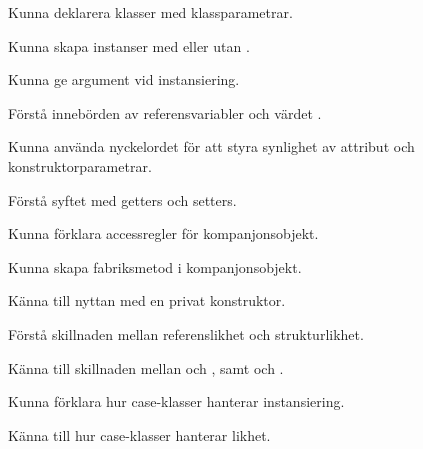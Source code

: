 

\item Kunna deklarera klasser med klassparametrar.
\item Kunna skapa instanser med eller utan .
\item Kunna ge argument vid instansiering.
\item Förstå innebörden av referensvariabler och värdet .

\item Kunna använda nyckelordet  för att styra synlighet av attribut och konstruktorparametrar.

\item Förstå syftet med getters och setters.
\item Kunna förklara accessregler för kompanjonsobjekt.
\item Kunna skapa fabriksmetod i kompanjonsobjekt.
\item Känna till nyttan med en privat konstruktor.

\item Förstå skillnaden mellan referenslikhet och strukturlikhet.
\item Känna till skillnaden mellan \code{==} och , samt \code{!=} och .

\item Kunna förklara hur case-klasser hanterar instansiering.
\item Känna till hur case-klasser hanterar likhet.
